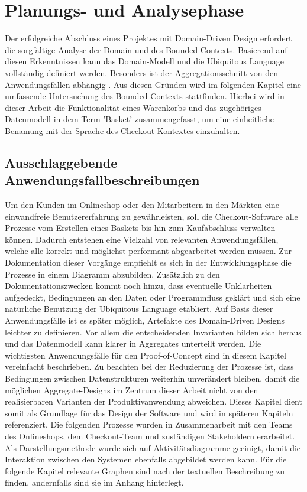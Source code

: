 

\chapter{Planungs- und Analysephase}

Der erfolgreiche Abschluss eines Projektes mit Domain-Driven Design erfordert die sorgfältige Analyse der Domain und des Bounded-Contexts. Basierend auf diesen Erkenntnissen kann das Domain-Modell und die Ubiquitous Language vollständig definiert werden. Besonders ist der Aggregationsschnitt von den Anwendungsfällen abhängig \cite[S. 358]{Vernon.2015}. Aus diesen Gründen wird im folgenden Kapitel eine umfassende Untersuchung des Bounded-Contexts stattfinden. Hierbei wird in dieser Arbeit die Funktionalität eines Warenkorbs und das zugehöriges Datenmodell in dem Term 'Basket' zusammengefasst, um eine einheitliche Benamung mit der Sprache des Checkout-Kontextes einzuhalten.

\section{Ausschlaggebende Anwendungsfallbeschreibungen}


Um den Kunden im Onlineshop oder den Mitarbeitern in den Märkten eine einwandfreie Benutzererfahrung zu gewährleisten, soll die Checkout-Software alle Prozesse vom Erstellen eines Baskets bis hin zum Kaufabschluss verwalten können. Dadurch entstehen eine Vielzahl von relevanten Anwendungsfällen, welche alle korrekt und möglichst performant abgearbeitet werden müssen. Zur Dokumentation dieser Vorgänge empfiehlt es sich in der Entwicklungsphase die Prozesse in einem Diagramm abzubilden. Zusätzlich zu den Dokumentationszwecken kommt noch hinzu, dass eventuelle Unklarheiten aufgedeckt, Bedingungen an den Daten oder Programmfluss geklärt und sich eine natürliche Benutzung der Ubiquitous Language etabliert. Auf Basis dieser Anwendungsfälle ist es später möglich, Artefakte des Domain-Driven Designs leichter zu definieren. Vor allem die entscheidenden Invarianten bilden sich heraus und das Datenmodell kann klarer in Aggregates unterteilt werden. Die wichtigsten Anwendungsfälle für den Proof-of-Concept sind in diesem Kapitel vereinfacht beschrieben. Zu beachten bei der Reduzierung der Prozesse ist, dass Bedingungen zwischen Datenstrukturen weiterhin unverändert bleiben, damit die möglichen Aggregate-Designs im Zentrum dieser Arbeit nicht von den realisierbaren Varianten der Produktivanwendung abweichen. Dieses Kapitel dient somit als Grundlage für das Design der Software und wird in späteren Kapiteln referenziert. Die folgenden Prozesse wurden in Zusammenarbeit mit den Teams des Onlineshops, dem Checkout-Team und zuständigen \Gls{Stakeholder}n erarbeitet. Als Darstellungsmethode wurde sich auf Aktivitätsdiagramme geeinigt, damit die Interaktion zwischen den Systemen ebenfalls abgebildet werden kann. Für die folgende Kapitel relevante Graphen sind nach der textuellen Beschreibung zu finden, andernfalls sind sie im Anhang hinterlegt. 

